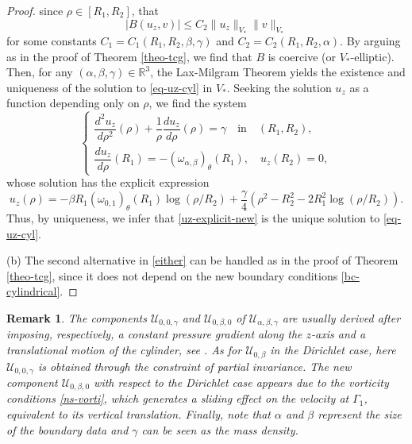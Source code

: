 \documentclass[a4paper,11pt]{amsart}
\newtheorem{remark}{Remark}[section]
\numberwithin{equation}{section}
\numberwithin{figure}{section}
\def\U{{\mathcal U}}
\begin{document}
\begin{proof}
		since $\rho\in [R_1,R_2]$, that $$|B(u_z, v)|\leq C_2 \|u_z\|_{V_*}\|v\|_{V_*}$$ for some constants $C_1=C_1(R_1,R_2,\beta, \gamma)$ and $C_2=C_2(R_1,R_2, \alpha)$. By arguing
        as in the proof of Theorem \ref{theo-tcg}, we find that
	$B$ is coercive (or $V_*$-elliptic). Then, for any $(\alpha, \beta,\gamma)\in \mathbb{R}^3$, the Lax-Milgram Theorem yields the existence and uniqueness of the solution to \eqref{eq-uz-cyl} in $V_*$. Seeking the solution $u_z$ as a function depending only on $\rho$, we find the system
	\begin{equation*}
		\begin{cases}
			\dfrac{d^2 {u_z}}{d\rho^2}(\rho) +\dfrac{1}{\rho}\dfrac{d{u_z}}{d\rho}(\rho) =\gamma \quad \text{in} \quad (R_1,R_2),\\[7pt]
			\dfrac{d u_z}{d\rho}(R_1)=-(\omega_{\alpha,\beta})_\theta(R_1), \quad   {u}_{z}(R_2)=0,
		\end{cases}
	\end{equation*}whose solution has the explicit expression
	\begin{equation}\label{uz-explicit-new}
		{u}_{z}(\rho)=  -\beta R_1(\omega_{0,1})_\theta(R_1)\log(\rho/R_2) + \frac{\gamma}{4}\left( \rho^2-R_2^2 -2R_1^2\log(\rho/R_2)\right).
	\end{equation}
	Thus, by uniqueness, we infer that \eqref{uz-explicit-new} is the unique solution to \eqref{eq-uz-cyl}.\par

	(b) The second alternative in \eqref{either} can be handled as in the proof of Theorem \ref{theo-tcg}, since it does not depend on the new boundary conditions \eqref{bc-cylindrical}.
\end{proof}

\begin{remark}
The components $\U_{0,0,\gamma}$ and 
$\U_{0,\beta,0}$ of $\U_{\alpha,\beta,\gamma}$ are usually derived after imposing, respectively, a constant pressure gradient along the $z$-axis and a translational motion of the cylinder, see \cite{Joseph}. As for $\U_{0,\beta}$ in the Dirichlet case, here $\U_{0,0,\gamma}$ is obtained through the constraint of partial invariance.  The new component $\U_{0,\beta,0}$ with respect to the Dirichlet case appears due to the vorticity conditions \eqref{ns-vorti}, which generates a sliding effect on the velocity at $\Gamma_1$, equivalent to its vertical translation.
Finally, note that $\alpha$ and $\beta$ represent the size of the boundary data and $\gamma$ can be seen as the mass density.
\end{remark}
\end{document}
